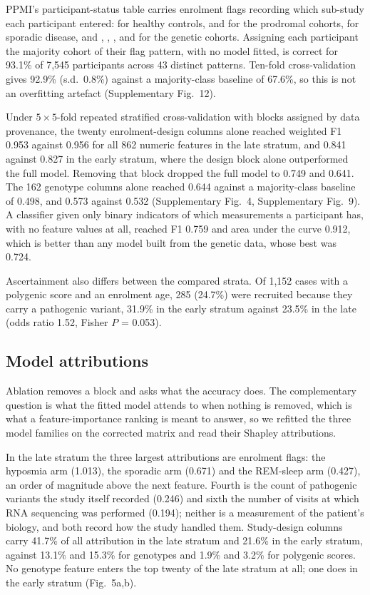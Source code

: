 \documentclass[10pt]{article}
\begin{document}
PPMI's participant-status table carries enrolment flags recording which sub-study each
participant entered:  for healthy controls,  and  for
the prodromal cohorts,  for sporadic disease, and , ,
,  and  for the genetic cohorts. Assigning each
participant the majority cohort of their flag pattern, with no model fitted, is correct for
93.1\% of 7,545 participants across 43 distinct patterns. Ten-fold cross-validation gives 92.9\%
(s.d.\ 0.8\%) against a majority-class baseline of 67.6\%, so this is not an overfitting artefact
(Supplementary Fig.~12).

Under $5\times5$-fold repeated stratified cross-validation with blocks assigned by data
provenance, the twenty enrolment-design columns alone reached weighted F1 0.953 against 0.956 for
all 862 numeric features in the late stratum, and 0.841 against 0.827 in the early stratum, where
the design block alone outperformed the full model. Removing that block dropped the full model to
0.749 and 0.641. The 162 genotype columns alone reached 0.644 against a majority-class baseline
of 0.498, and 0.573 against 0.532 (Supplementary Fig.~4, Supplementary Fig.~9). A classifier given only binary indicators of which
measurements a participant has, with no feature values at all, reached F1 0.759 and area under the
curve 0.912, which is better than any model built from the genetic data, whose best was 0.724.

Ascertainment also differs between the compared strata. Of 1,152 cases with a polygenic score and
an enrolment age, 285 (24.7\%) were recruited because they carry a pathogenic variant, 31.9\% in
the early stratum against 23.5\% in the late (odds ratio 1.52, Fisher $P$ = 0.053).

\subsection*{Model attributions}

Ablation removes a block and asks what the accuracy does. The complementary question is what the
fitted model attends to when nothing is removed, which is what a feature-importance ranking is
meant to answer, so we refitted the three model families on the corrected matrix and read their
Shapley attributions.

In the late stratum the three largest attributions are enrolment flags: the hyposmia arm (1.013),
the sporadic arm (0.671) and the REM-sleep arm (0.427), an order of magnitude above the next
feature. Fourth is the count of pathogenic variants the study itself recorded (0.246) and sixth
the number of visits at which RNA sequencing was performed (0.194); neither is a measurement of
the patient's biology, and both record how the study handled them. Study-design columns carry
41.7\% of all attribution in the late stratum and 21.6\% in the early stratum, against 13.1\% and
15.3\% for genotypes and 1.9\% and 3.2\% for polygenic scores. No genotype feature enters the top
twenty of the late stratum at all; one does in the early stratum (Fig.~5a,b).
\end{document}
